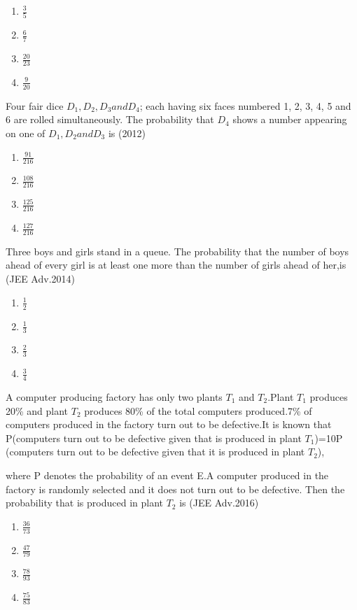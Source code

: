 \begin{multicols}{4}
\begin{enumerate}
    \item $\frac{3}{5}$
    \item $\frac{6}{7}$
    \item $\frac{20}{23}$
    \item $\frac{9}{20}$
\end{enumerate}
\end{multicols}
\item Four fair dice $D_{1},D_{2},D_{3} and D_{4}$; each having six faces numbered 1, 2, 3, 4, 5 and 6 are rolled simultaneously.
The probability that $D_{4}$ shows a number appearing on one of $D_{1},D_{2}andD_{3}$ is \hfill (2012)
\begin{multicols}{4}
\begin{enumerate}
    \item $\frac{91}{216}$
    \item $\frac{108}{216}$
    \item $\frac{125}{216}$
    \item $\frac{127}{216}$
\end{enumerate}
\end{multicols}
\item Three boys and girls stand in a queue. The probability that the number of boys ahead of every girl is at least one more than the number of girls ahead of her,is \hfill (JEE Adv.2014)
\begin{multicols}{4}
\begin{enumerate}
    \item $\frac{1}{2}$
    \item $\frac{1}{3}$
    \item $\frac{2}{3}$
    \item $\frac{3}{4}$
\end{enumerate}
\end{multicols}
\item A computer producing factory has only two plants $T_{1}$ and $T_{2}$.Plant $T_{1}$ produces 20\% and plant $T_{2}$ produces 80\% of the total computers produced.7\% of computers produced in the factory turn out to be defective.It is known that P(computers turn out to be defective given that is produced in plant $T_{1}$)=10P (computers turn out to be defective given that it is produced in plant $T_{2}$),

where P denotes the probability of an event E.A computer produced in the factory is randomly selected and it does not turn out to be defective. Then the probability that is produced in plant $T_{2}$ is \hfill (JEE Adv.2016)
\begin{multicols}{4}
\begin{enumerate}
    \item $\frac{36}{73}$
    \item $\frac{47}{79}$
    \item $\frac{78}{93}$
    \item $\frac{75}{83}$
\end{enumerate}
    
\end{multicols}






